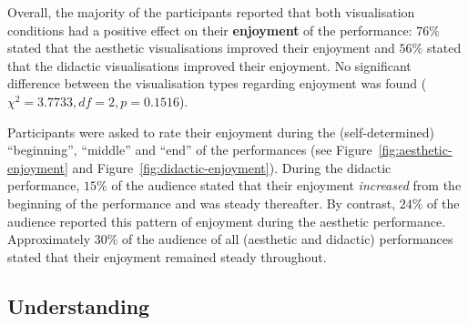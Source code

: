Overall, the majority of the participants reported that both
visualisation conditions had a positive effect on their
\textbf{enjoyment} of the performance: $76\%$ stated that the
aesthetic visualisations improved their enjoyment and $56\%$ stated
that the didactic visualisations improved their enjoyment. No
significant difference between the visualisation types regarding 
enjoyment was found ($\chi^2=3.7733,df=2,p=0.1516$).

Participants were asked to rate their enjoyment during the
(self-determined) ``beginning'', ``middle'' and ``end'' of the
performances (see Figure~\ref{fig:aesthetic-enjoyment} and
Figure~\ref{fig:didactic-enjoyment}). During the didactic
performance, $15\%$ of the audience stated that their enjoyment
\emph{increased} from the beginning of the performance and was
steady thereafter. By contrast, $24\%$ of the audience
reported this pattern of enjoyment during the aesthetic
performance. Approximately $30\%$ of the audience of all
(aesthetic and didactic) performances stated that their
enjoyment remained steady throughout.

\subsection{Understanding}

